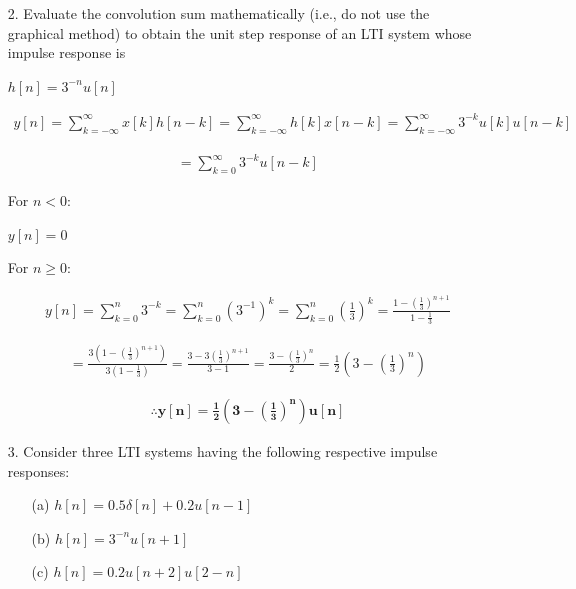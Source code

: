 \documentclass[fleqn]{article}
\begin{document}
\begin{enumerate}[nolistsep]
		\item[2.] Evaluate the convolution sum mathematically (i.e., do not use the graphical method) to obtain the unit step response of an LTI system whose impulse response is
		
		$h[n] = 3^{-n}u[n]$
		
		\begin{align*}
			y[n] = \sum_{k = -\infty}^{\infty}{x[k]h[n-k]} = \sum_{k = -\infty}^{\infty}{h[k]x[n-k]} = \sum_{k = -\infty}^{\infty}{3^{-k}u[k]u[n-k]}
		\end{align*}
		
		\begin{align*}
			= \sum_{k = 0}^{\infty}{3^{-k}u[n-k]}
		\end{align*}
		
		For $n < 0$:
		
		$y[n] = 0$
		
		\break
		
		For $n \geq 0$:
		
		\begin{align*}
			y[n] = \sum_{k = 0}^{n}{3^{-k}} = \sum_{k = 0}^{n}{(3^{-1})^k} = \sum_{k = 0}^{n}{\left(\frac{1}{3}\right)^k} = \frac{1-\left(\frac{1}{3}\right)^{n+1}}{1-\frac{1}{3}}
		\end{align*}
		
		\begin{align*}
			 = \frac{3\left(1-\left(\frac{1}{3}\right)^{n+1}\right)}{3\left(1-\frac{1}{3}\right)} = \frac{3-3\left(\frac{1}{3}\right)^{n+1}}{3-1} = \frac{3-\left(\frac{1}{3}\right)^{n}}{2} = \frac{1}{2}\left(3-\left(\frac{1}{3}\right)^{n}\right)
		\end{align*}
		
		\begin{align*}
			\mathbf{\therefore y[n] = \frac{1}{2}\left(3-\left(\frac{1}{3}\right)^{n}\right)u[n]}
		\end{align*}
		
		\item[3.] Consider three LTI systems having the following respective impulse responses:
		
			\begin{enumerate}[nolistsep]
				\item[(a)] $h[n] = 0.5\delta[n] + 0.2u[n-1]$
				
				\item[(b)] $h[n] = 3^{-n}u[n+1]$
				
				\item[(c)] $h[n] = 0.2u[n+2]u[2-n]$
				

\end{enumerate}
\end{enumerate}
\end{document}
